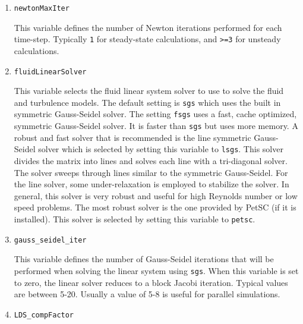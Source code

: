 \documentclass{article}
\begin{document}
\begin{enumerate}
\item {\tt newtonMaxIter}
  
  This variable defines the number of Newton iterations performed
  for each time-step.  Typically {\tt 1} for steady-state calculations,
  and {\tt >=3} for unsteady calculations.

\item {\tt fluidLinearSolver }

  This variable selects the fluid linear system solver to use to solve
  the fluid and turbulence models.  The default setting is {\tt sgs}
  which uses the built in symmetric Gauss-Seidel solver.  The setting
  {\tt fsgs} uses a fast, cache optimized, symmetric Gauss-Seidel
  solver.  It is faster than {\tt sgs} but uses more memory.  A robust
  and fast solver that is recommended is the line symmetric
  Gauss-Seidel solver which is selected by setting this variable to
  {\tt lsgs}.  This solver divides the matrix into lines and solves
  each line with a tri-diagonal solver.  The solver sweeps through
  lines similar to the symmetric Gauss-Seidel.  For the line solver,
  some under-relaxation is employed to stabilize the solver.  In general,
  this solver is very robust and useful for high Reynolds number or
  low speed problems.  The most robust solver is the one provided by
  PetSC (if it is installed).  This solver is selected by setting this
  variable to {\tt petsc}.

\item {\tt gauss\_seidel\_iter}

  This variable defines the number of Gauss-Seidel iterations that
  will be performed when solving the linear system using {\tt sgs}.
  When this variable is set to zero, the linear solver reduces to a
  block Jacobi iteration.  Typical values are between 5-20.  Usually a
  value of 5-8 is useful for parallel simulations.





\item {\tt LDS\_compFactor}


\end{enumerate}
\end{document}
